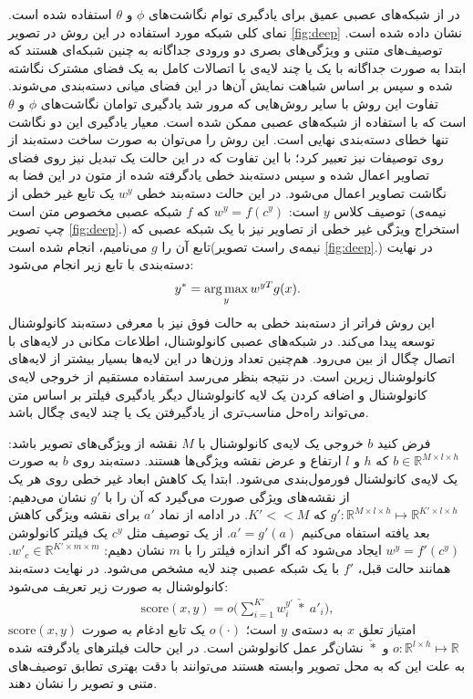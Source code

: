 در  \cite{ba2015} از شبکه‌های عصبی عمیق برای یادگیری توام نگاشت‌های $\phi$ و $\theta$ استفاده شده است. نمای کلی شبکه مورد استفاده در این روش در تصویر
\ref{fig:deep}
نشان داده شده است. توصیف‌های متنی و ويژگی‌های بصری دو ورودی جداگانه به چنین شبکه‌ای هستند که ابتدا به صورت جداگانه با یک یا چند لایه‌ی با اتصالات کامل به یک فضای مشترک نگاشته شده و سپس بر اساس شباهت نمایش آن‌ها در این فضای میانی دسته‌بندی می‌شوند. تفاوت این روش با سایر روش‌هایی که مرور شد یادگیری توامان نگاشت‌های  $\phi$ و $\theta$ است که با استفاده از شبکه‌های عصبی ممکن شده است. معیار یادگیری این دو نگاشت تنها خطای دسته‌بندی نهایی است.
این روش را می‌توان به صورت ساخت دسته‌بند از روی توصیفات نیز تعبیر کرد؛ با این تفاوت که در این حالت یک تبدیل نیز روی فضای تصاویر اعمال شده و سپس دسته‌بند خطی یادگرفته شده از متون در این فضا به نگاشت تصاویر اعمال می‌شود. در این حالت دسته‌بند خطی $w^y$ یک تابع غیر خطی از توصیف کلاس $y$ است: $w^y = f(c^y)$ که $f$ شبکه عصبی مخصوص متن است (نیمه‌ی چپ تصویر \ref{fig:deep}.) استخراج ویژگی غیر خطی از تصاویر نیز با یک شبکه عصبی که تابع آن را $g$ می‌نامیم، انجام شده است(نیمه‌ی راست تصویر \ref{fig:deep}.) در نهایت دسته‌بندی با تابع زیر انجام می‌شود:
\begin{equation} \label{eq:ba_classifier}
y^* = \operatorname*{arg\,max}_y{w^{yT} g(x)}.
\end{equation}
این روش فراتر از دسته‌بند خطی به حالت فوق نیز با معرفی دسته‌بند کانولوشنال توسعه پیدا می‌کند. در شبکه‌های عصبی کانولوشنال، اطلاعات مکانی در  لایه‌های با اتصال چگال از بین می‌رود. هم‌چنین تعداد وزن‌ها در این لایه‌ها بسیار بیشتر از لایه‌های کانولوشنال زیرین است. در نتیجه بنظر می‌رسد استفاده مستقیم از خروجی لایه‌ی کانولوشنال و اضافه کردن یک لایه کانولوشنال دیگر یادگیری فیلتر بر اساس متن می‌تواند راه‌حل مناسب‌تری از یادگیرفتن یک یا چند لایه‌ی چگال باشد.

فرض کنید $b$ خروجی یک لایه‌ی کانولوشنال با $M$ نقشه از ویژگی‌های تصویر باشد: $b \in \mathbb{R}^{M\times l \times h}$ که $h$ و $l$ ارتفاع و عرض نقشه ویژگی‌ها هستند. دسته‌بند روی $b$ به صورت یک لایه‌ی کانولشنال فورمول‌بندی می‌شود. ابتدا یک کاهش ابعاد غیر خطی روی هر یک از نقشه‌های ویژگی صورت می‌گیرد که آن را با $g'$ نشان می‌دهیم:
$g': \mathbb{R}^{M\times l\times h} \mapsto \mathbb{R}^{K'\times l\times h}$
که
$K' << M$.
در ادامه از نماد  $a'$ برای نقشه ویژگی کاهش بعد یافته استفاه می‌کنیم
$a' = g'(a)$.
از یک توصیف مثل $c^y$ یک  فیلتر کانولوشن $w^y = f'(c^y)$ ایجاد می‌شود که اگر اندازه فیلتر را با $m$ نشان دهیم: $w'_c \in \mathbb{R}^{K' \times m \times m}$. همانند حالت قبل، $f'$ با یک شبکه عصبی چند لایه مشخص می‌شود. در نهایت دسته‌بند کانولوشنال به صورت زیر تعریف می‌شود:
\begin{align}
\label{eq:conv}
\text{score}(x,y)=o\bigg(\sum_{i=1}^{K'}w^{y'}_{i}\  \check{*} \  a'_i\bigg),
\end{align}
 $\text{score}(x,y)$
  امتیاز تعلق $x$ به دسته‌ی $y$ است؛ $o(\cdot)$ یک تابع ادغام به صورت $o:\mathbb{R}^{l\times h} \mapsto \mathbb{R}$  و $\check{*}$ نشان‌گر عمل کانولوشن است. در این حالت فیلترهای یادگرفته شده به علت این که به محل تصویر وابسته هستند می‌توانند با دقت بهتری تطابق توصیف‌های متنی و تصویر را نشان دهند.

